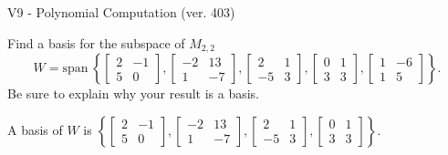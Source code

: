 \begin{exercise}
  \begin{exerciseTitle}V9 - Polynomial Computation (ver. 403)\end{exerciseTitle}
  \begin{exerciseStatement}
    Find a basis for the subspace of \(M_{2,2}\) 
\[W=\mathrm{span}\ \left\{\left[\begin{array}{cc}
2 & -1 \\
5 & 0
\end{array}\right] , \left[\begin{array}{cc}
-2 & 13 \\
1 & -7
\end{array}\right] , \left[\begin{array}{cc}
2 & 1 \\
-5 & 3
\end{array}\right] , \left[\begin{array}{cc}
0 & 1 \\
3 & 3
\end{array}\right] , \left[\begin{array}{cc}
1 & -6 \\
1 & 5
\end{array}\right]\right\}.\]
 Be sure to explain why your result is a basis.


  \end{exerciseStatement}
  \begin{exerciseAnswer}
   A basis of \(W\) is  \(\left\{\left[\begin{array}{cc}
2 & -1 \\
5 & 0
\end{array}\right] , \left[\begin{array}{cc}
-2 & 13 \\
1 & -7
\end{array}\right] , \left[\begin{array}{cc}
2 & 1 \\
-5 & 3
\end{array}\right] , \left[\begin{array}{cc}
0 & 1 \\
3 & 3
\end{array}\right]\right\}\).
  


  \end{exerciseAnswer}
\end{exercise}